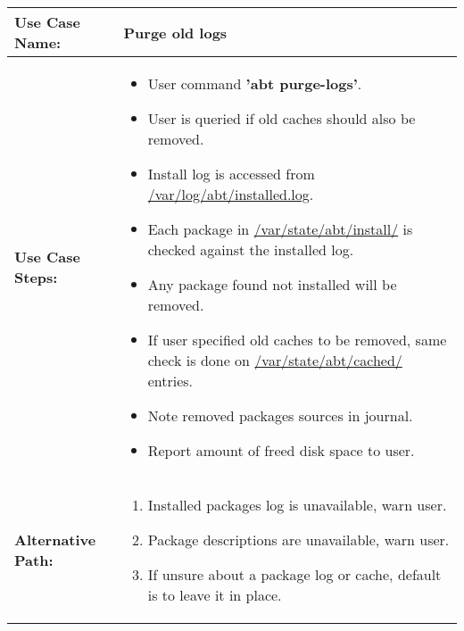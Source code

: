 \medskip

\begin{tabularx}{\linewidth}{|l|X|}
\hline
\textbf{Use Case Name:} & \textbf{Purge old logs} \\
\hline
\textbf{Use Case Steps:} & 
\begin{minipage}{\linewidth} 
  \vspace{0.05em}
  \begin{itemize}
    \item User command \textbf{'abt purge-logs'}.
    \item User is queried if old caches should also be removed.
    \item Install log is accessed from \url{/var/log/abt/installed.log}.
    \item Each package in \url{/var/state/abt/install/} is checked against the installed log.
    \item Any package found not installed will be removed.
    \item If user specified old caches to be removed, same check is done on \url{/var/state/abt/cached/} entries.
    \item Note removed packages sources in journal.
    \item Report amount of freed disk space to user.
  \end{itemize}
  \vspace{0.05em}
\end{minipage}
\\
\hline 
\textbf{Alternative Path:} &
\begin{minipage}{\linewidth}
  \vspace{0.05em} 
  \begin{enumerate}
    \item Installed packages log is unavailable, warn user.
    \item Package descriptions are unavailable, warn user.
    \item If unsure about a package log or cache, default is to leave it in place.
  \end{enumerate}
  \vspace{0.05em} 
\end{minipage}
\\
\hline
\end{tabularx}